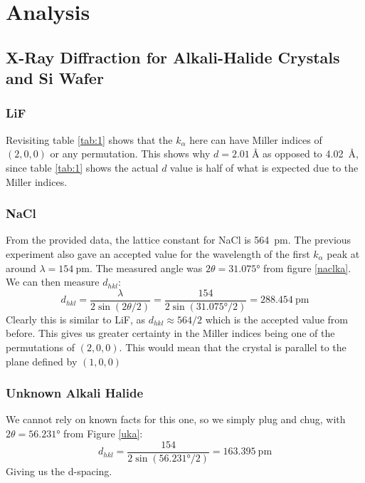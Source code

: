 \documentclass[letterpaper,12pt]{article}
\begin{document}
\section{Analysis}

\subsection{X-Ray Diffraction for Alkali-Halide Crystals and Si Wafer}
\subsubsection{LiF}

Revisiting table \ref{tab:1} shows that the $k_\alpha$ here can have Miller indices of $(2,0,0)$ or any permutation. This shows why $d=\SI{2.01}{\angstrom}$ as opposed to \SI{4.02}{\angstrom}, since table \ref{tab:1} shows the actual $d$ value is half of what is expected due to the Miller indices.

\subsubsection{NaCl}

From the provided data, the lattice constant for NaCl is \SI{564}{\pico\meter}. The previous experiment also gave an accepted value for the wavelength of the first $k_\alpha$ peak at around $\lambda=\SI{154}{\pico\meter}$. The measured angle was $2\theta=\ang{31.075}$ from figure \ref{naclka}. We can then measure $d_{hkl}$:
\begin{equation}
  d_{hkl}=\frac{\lambda}{2\sin(2\theta/2)}=\frac{154}{2\sin(\ang{31.075}/2)}=
  \boxed{\SI{288.454}{\pico\meter}}
\end{equation}
Clearly this is similar to LiF, as $d_{hkl}\approx 564/2$ which is the accepted value from before. This gives us greater certainty in the Miller indices being one of the permutations of $(2,0,0)$. This would mean that the crystal is parallel to the plane defined by $(1,0,0)$
\subsubsection{Unknown Alkali Halide}
We cannot rely on known facts for this one, so we simply plug and chug, with $2\theta=\ang{56.231}$ from Figure \ref{uka}:
\begin{equation}
  d_{hkl}=\frac{154}{2\sin(\ang{56.231}/2)}=\boxed{\SI{163.395}{\pico\meter}}
\end{equation}
Giving us the d-spacing. 
\end{document}
